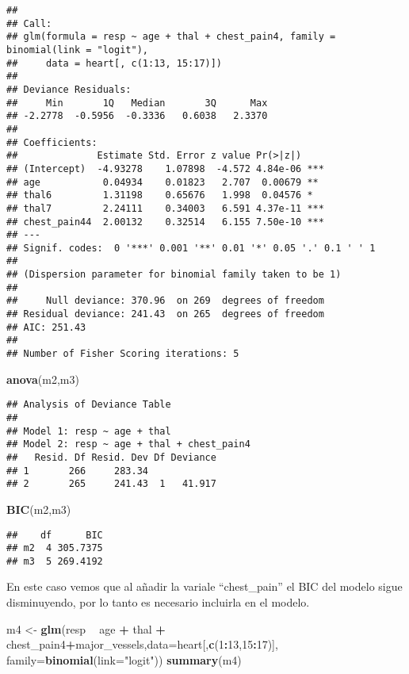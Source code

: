 \documentclass[]{article}
\newenvironment{Shaded}{\begin{snugshade}}{\end{snugshade}}
\newcommand{\KeywordTok}[1]{\textcolor[rgb]{0.13,0.29,0.53}{\textbf{#1}}}
\newcommand{\DataTypeTok}[1]{\textcolor[rgb]{0.13,0.29,0.53}{#1}}
\newcommand{\DecValTok}[1]{\textcolor[rgb]{0.00,0.00,0.81}{#1}}
\newcommand{\StringTok}[1]{\textcolor[rgb]{0.31,0.60,0.02}{#1}}
\newcommand{\OperatorTok}[1]{\textcolor[rgb]{0.81,0.36,0.00}{\textbf{#1}}}
\newcommand{\NormalTok}[1]{#1}
\begin{document}
\begin{verbatim}
## 
## Call:
## glm(formula = resp ~ age + thal + chest_pain4, family = binomial(link = "logit"), 
##     data = heart[, c(1:13, 15:17)])
## 
## Deviance Residuals: 
##     Min       1Q   Median       3Q      Max  
## -2.2778  -0.5956  -0.3336   0.6038   2.3370  
## 
## Coefficients:
##              Estimate Std. Error z value Pr(>|z|)    
## (Intercept)  -4.93278    1.07898  -4.572 4.84e-06 ***
## age           0.04934    0.01823   2.707  0.00679 ** 
## thal6         1.31198    0.65676   1.998  0.04576 *  
## thal7         2.24111    0.34003   6.591 4.37e-11 ***
## chest_pain44  2.00132    0.32514   6.155 7.50e-10 ***
## ---
## Signif. codes:  0 '***' 0.001 '**' 0.01 '*' 0.05 '.' 0.1 ' ' 1
## 
## (Dispersion parameter for binomial family taken to be 1)
## 
##     Null deviance: 370.96  on 269  degrees of freedom
## Residual deviance: 241.43  on 265  degrees of freedom
## AIC: 251.43
## 
## Number of Fisher Scoring iterations: 5
\end{verbatim}

\begin{Shaded}
\begin{Highlighting}[]
\KeywordTok{anova}\NormalTok{(m2,m3)}
\end{Highlighting}
\end{Shaded}

\begin{verbatim}
## Analysis of Deviance Table
## 
## Model 1: resp ~ age + thal
## Model 2: resp ~ age + thal + chest_pain4
##   Resid. Df Resid. Dev Df Deviance
## 1       266     283.34            
## 2       265     241.43  1   41.917
\end{verbatim}

\begin{Shaded}
\begin{Highlighting}[]
\KeywordTok{BIC}\NormalTok{(m2,m3)}
\end{Highlighting}
\end{Shaded}

\begin{verbatim}
##    df      BIC
## m2  4 305.7375
## m3  5 269.4192
\end{verbatim}

En este caso vemos que al añadir la variale ``chest\_pain'' el BIC del
modelo sigue disminuyendo, por lo tanto es necesario incluirla en el
modelo.

\begin{Shaded}
\begin{Highlighting}[]
\NormalTok{m4 <-}\StringTok{  }\KeywordTok{glm}\NormalTok{(resp }\OperatorTok{~}\StringTok{ }\NormalTok{age  }\OperatorTok{+}\StringTok{ }\NormalTok{thal }\OperatorTok{+}\StringTok{  }\NormalTok{chest_pain4}\OperatorTok{+}\NormalTok{major_vessels,}\DataTypeTok{data=}\NormalTok{heart[,}\KeywordTok{c}\NormalTok{(}\DecValTok{1}\OperatorTok{:}\DecValTok{13}\NormalTok{,}\DecValTok{15}\OperatorTok{:}\DecValTok{17}\NormalTok{)], }\DataTypeTok{family=}\KeywordTok{binomial}\NormalTok{(}\DataTypeTok{link=}\StringTok{"logit"}\NormalTok{)) }
\KeywordTok{summary}\NormalTok{(m4)}
\end{Highlighting}
\end{Shaded}
\end{document}
